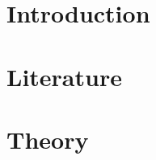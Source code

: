 























%








\maketitle

\thispagestyle{empty}

\clearpage

\pagestyle{scrheadings}

\small {
\tableofcontents
\listoffigures
\listoftables
}
\clearpage
\normalsize

\section{Introduction}


\section{Literature}


\section{Theory}


